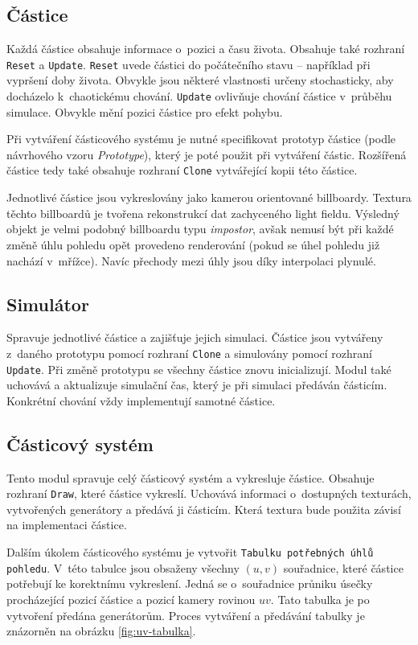 \subsection*{Částice} Každá částice obsahuje informace o~pozici a času života. Obsahuje také rozhraní \texttt{Reset} a \texttt{Update}. \texttt{Reset} uvede částici do počátečního stavu -- například při vypršení doby života. Obvykle jsou některé vlastnosti určeny stochasticky, aby docházelo k~chaotickému chování. \texttt{Update} ovlivňuje chování částice v~průběhu simulace. Obvykle mění pozici částice pro efekt pohybu. 

Při vytváření částicového systému je nutné specifikovat prototyp částice (podle návrhového vzoru \emph{Prototype}), který je poté použit při vytváření částic. Rozšířená částice tedy také obsahuje rozhraní \texttt{Clone} vytvářející kopii této částice. 

Jednotlivé částice jsou vykreslovány jako kamerou orientované billboardy. Textura těchto billboardů je tvořena rekonstrukcí dat zachyceného light fieldu. Výsledný objekt je velmi podobný billboardu typu \emph{impostor}, avšak nemusí být při každé změně úhlu pohledu opět provedeno renderování (pokud se úhel pohledu již nachází v~mřížce). Navíc přechody mezi úhly jsou díky interpolaci plynulé.

\subsection*{Simulátor} Spravuje jednotlivé částice a zajišťuje jejich simulaci. Částice jsou vytvářeny z~daného prototypu pomocí rozhraní \texttt{Clone} a simulovány pomocí rozhraní \texttt{Update}. Při změně prototypu se všechny částice znovu inicializují. Modul také uchovává a aktualizuje simulační čas, který je při simulaci předáván částicím. Konkrétní chování vždy implementují samotné částice. 


\subsection*{Částicový systém} Tento modul spravuje celý částicový systém a vykresluje částice. Obsahuje rozhraní \texttt{Draw}, které částice vykreslí. Uchovává informaci o~dostupných texturách, vytvořených generátory a předává ji částicím. Která textura bude použita závisí na implementaci částice. 

Dalším úkolem částicového systému je vytvořit \texttt{Tabulku potřebných úhlů pohledu}. V~této tabulce jsou obsaženy všechny ${(u,v)}$ souřadnice, které částice potřebují ke korektnímu vykreslení. Jedná se o~souřadnice průniku úsečky procházející pozicí částice a pozicí kamery rovinou ${uv}$. Tato tabulka je po vytvoření předána generátorům. Proces vytváření a předávání tabulky je znázorněn na obrázku \ref{fig:uv-tabulka}.

